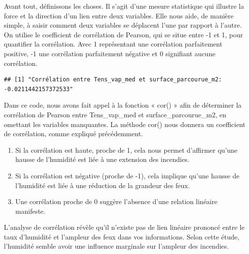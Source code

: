 \documentclass[
]{article}
\newenvironment{Shaded}{\begin{snugshade}}{\end{snugshade}}
\newcommand{\AttributeTok}[1]{\textcolor[rgb]{0.13,0.29,0.53}{#1}}
\newcommand{\FunctionTok}[1]{\textcolor[rgb]{0.13,0.29,0.53}{\textbf{#1}}}
\newcommand{\NormalTok}[1]{#1}
\newcommand{\OtherTok}[1]{\textcolor[rgb]{0.56,0.35,0.01}{#1}}
\newcommand{\SpecialCharTok}[1]{\textcolor[rgb]{0.81,0.36,0.00}{\textbf{#1}}}
\newcommand{\StringTok}[1]{\textcolor[rgb]{0.31,0.60,0.02}{#1}}
\begin{document}
Avant tout, définissons les choses. Il s'agit d'une mesure statistique
qui illustre la force et la direction d'un lien entre deux variables.
Elle nous aide, de manière simple, à saisir comment deux variables se
déplacent l'une par rapport à l'autre. On utilise le coefficient de
corrélation de Pearson, qui se situe entre -1 et 1, pour quantifier la
corrélation. Avec 1 représentant une corrélation parfaitement positive,
-1 une corrélation parfaitement négative et 0 signifiant aucune
corrélation.

\begin{Shaded}
\end{Shaded}

\begin{verbatim}
## [1] "Corrélation entre Tens_vap_med et surface_parcourue_m2:  -0.0211442157372533"
\end{verbatim}

Dans ce code, nous avons fait appel à la fonction « cor() » afin de
déterminer la corrélation de Pearson entre Tens\_vap\_med et
surface\_parcourue\_m2, en omettant les variables manquantes. La méthode
cor() nous donnera un coefficient de corrélation, comme expliqué
précédemment.

\begin{enumerate}
\def\labelenumi{\arabic{enumi}.}
\item
  Si la corrélation est haute, proche de 1, cela nous permet d'affirmer
  qu'une hausse de l'humidité est liée à une extension des incendies.
\item
  Si la corrélation est négative (proche de -1), cela implique qu'une
  hausse de l'humidité est liée à une réduction de la grandeur des feux.
\item
  Une corrélation proche de 0 suggère l'absence d'une relation linéaire
  manifeste.
\end{enumerate}

L'analyse de corrélation révèle qu'il n'existe pas de lien linéaire
prononcé entre le taux d'humidité et l'ampleur des feux dans vos
informations. Selon cette étude, l'humidité semble avoir une influence
marginale sur l'ampleur des incendies.
\end{document}

